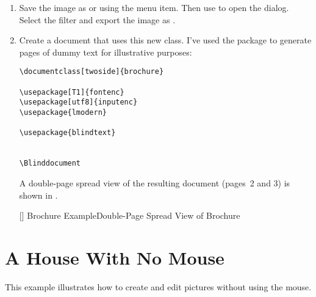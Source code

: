 \begin{enumerate}
[]
{}
{Brochure Example\dash All Pages View Again (All Frames Shown in their
Odd Page Position)}

\item Save the image as  or
 using the  menu
item. Then use  to open the
 dialog. Select the
 filter and export the image as
.

\item Create a document that uses this new class. I've used the
 package to generate pages of dummy text for
illustrative purposes:
\begin{verbatim}
\documentclass[twoside]{brochure}

\usepackage[T1]{fontenc}
\usepackage[utf8]{inputenc}
\usepackage{lmodern}

\usepackage{blindtext}


\Blinddocument

\end{verbatim}

A double-page spread view of the resulting document (pages~2 and 3)
is shown in .

[]
{}
{Brochure Example\dash Double-Page Spread View of Brochure}

\end{enumerate}

\section{A House With No Mouse}\label{sec:accesstutorial}

This example illustrates how to create and edit pictures without
using the mouse.

